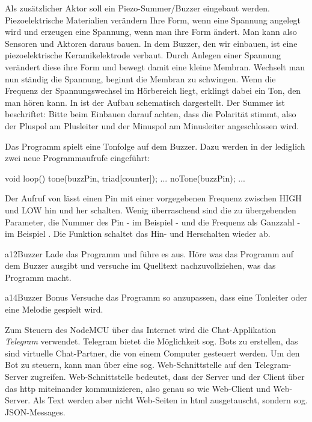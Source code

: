 Als zusätzlicher Aktor soll ein Piezo-Summer/Buzzer eingebaut werden. Piezoelektrische Materialien verändern Ihre Form,
wenn eine Spannung angelegt wird und erzeugen eine Spannung, wenn man ihre Form ändert. Man kann also Sensoren und
Aktoren daraus bauen. In dem Buzzer, den wir einbauen, ist eine piezoelektrische Keramikelektrode verbaut. Durch Anlegen einer
Spannung verändert diese ihre Form und bewegt damit eine kleine Membran. Wechselt man nun ständig die Spannung, beginnt die
Membran zu schwingen. Wenn die Frequenz der Spannungswechsel im Hörbereich liegt, erklingt dabei ein Ton, den man hören kann.
In  ist der Aufbau schematisch dargestellt. Der Summer ist beschriftet: Bitte beim Einbauen darauf achten, 
dass die Polarität stimmt, also der Pluspol am Plusleiter und der Minuspol am Minusleiter angeschlossen wird.

Das Programm  spielt eine Tonfolge auf dem Buzzer. Dazu werden in der  lediglich zwei
neue Programmaufrufe eingeführt:

\begin{src}
void loop() {
  tone(buzzPin, triad[counter]);
  ...
  noTone(buzzPin);
  ...
}
\end{src}

Der Aufruf von  lässt einen Pin mit einer vorgegebenen Frequenz zwischen HIGH und LOW
hin und her schalten. Wenig überraschend sind die zu übergebenden Parameter, die Nummer des Pin - im 
Beispiel  - und die Frequenz als Ganzzahl - im Beispiel .
Die Funktion  schaltet das Hin- und Herschalten wieder ab.

\vfill\null\pagebreak

\begin{excercise}{a12}{Buzzer}
Lade das Programm  und führe es aus.
Höre was das Programm auf dem Buzzer ausgibt und versuche im Quelltext
nachzuvollziehen, was das Programm macht.
\end{excercise}

\begin{excercise}{a14}{Buzzer Bonus}
Versuche das Programm so anzupassen, dass eine Tonleiter oder eine Melodie gespielt wird.
\end{excercise}


Zum Steuern des NodeMCU über das Internet wird die Chat-Applikation \emph{Telegram} verwendet.
Telegram bietet die Möglichkeit sog. Bots zu erstellen, das sind virtuelle Chat-Partner, die 
von einem Computer gesteuert werden. Um den Bot zu steuern, kann man über eine sog. Web-Schnittstelle
auf den Telegram-Server zugreifen. Web-Schnittstelle bedeutet, dass der Server und der Client
über das http miteinander kommunizieren, also genau so wie Web-Client und Web-Server. Als Text
werden aber nicht Web-Seiten in html ausgetauscht, sondern sog. JSON-Messages.

